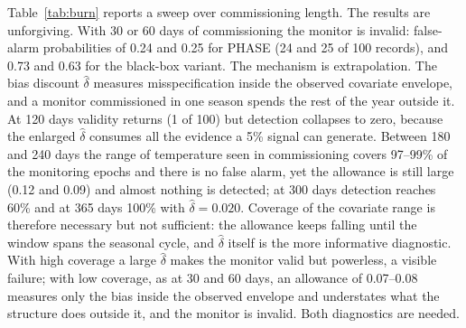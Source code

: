 \documentclass[12pt,a4paper]{article}
\newenvironment{revblock}{}{}
\newenvironment{revblock}{\begingroup\color{revcol}}{\endgroup}
\begin{document}
Table~\ref{tab:burn} reports a sweep over commissioning length. The results are unforgiving. With 30 or 60 days of commissioning the monitor is invalid: false-alarm probabilities of 0.24 and 0.25 for PHASE (24 and 25 of 100 records), and 0.73 and 0.63 for the black-box variant. The mechanism is extrapolation. The bias discount $\hat\delta$ measures misspecification inside the observed covariate envelope, and a monitor commissioned in one season spends the rest of the year outside it. At 120 days validity returns (1 of 100) but detection collapses to zero, because the enlarged $\hat\delta$ consumes all the evidence a 5\% signal can generate. \begin{revblock}Between 180 and 240 days the range of temperature seen in commissioning covers 97--99\% of the monitoring epochs and there is no false alarm, yet the allowance is still large (0.12 and 0.09) and almost nothing is detected; at 300 days detection reaches 60\% and at 365 days 100\% with $\hat\delta=0.020$. Coverage of the covariate range is therefore necessary but not sufficient: the allowance keeps falling until the window spans the seasonal cycle, and $\hat\delta$ itself is the more informative diagnostic. With high coverage a large $\hat\delta$ makes the monitor valid but powerless, a visible failure; with low coverage, as at 30 and 60 days, an allowance of 0.07--0.08 measures only the bias inside the observed envelope and understates what the structure does outside it, and the monitor is invalid. Both diagnostics are needed.\end{revblock}
\end{document}
